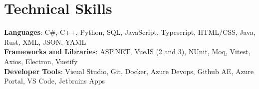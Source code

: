 \documentclass[letterpaper,11pt]{article}
\begin{document}
\section{Technical Skills}
\begin{itemize}[leftmargin=0.15in, label={}]
   \small{\item{
    \textbf{Languages}{: C\#, C++, Python, SQL, JavaScript, Typescript, HTML/CSS, Java, Rust, XML, JSON, YAML} \\
    \textbf{Frameworks and Libraries}{: ASP.NET, VueJS (2 and 3), NUnit, Moq, Vitest, Axios, Electron, Vuetify} \\
    \textbf{Developer Tools}{: Visual Studio, Git, Docker, Azure Devops, Github AE, Azure Portal, VS Code, Jetbrains Apps}
   }}
\end{itemize}


\end{document}
